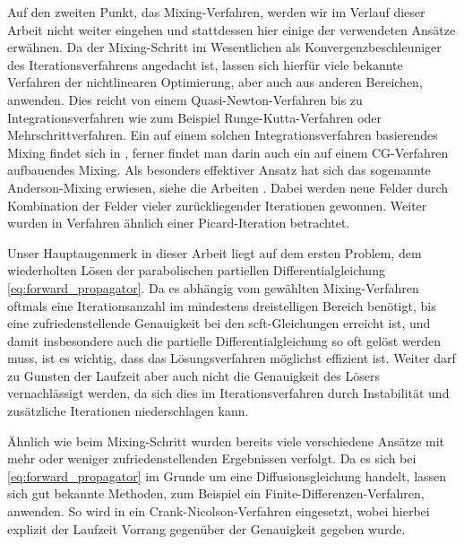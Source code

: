 \documentclass[../main.tex]{subfiles}
\begin{document}
%
Auf den zweiten Punkt, das Mixing-Verfahren, werden wir im Verlauf dieser Arbeit nicht weiter eingehen und stattdessen hier einige der verwendeten Ansätze erwähnen.
Da der Mixing-Schritt im Wesentlichen als Konvergenzbeschleuniger des Iterationsverfahrens angedacht ist, lassen sich hierfür viele bekannte Verfahren der nichtlinearen Optimierung, aber auch aus anderen Bereichen, anwenden.
Dies reicht von einem Quasi-Newton-Verfahren \cite{Matsen:1994bz} bis zu Integrationsverfahren wie zum Beispiel Runge-Kutta-Verfahren oder Mehrschrittverfahren.
Ein auf einem solchen Integrationsverfahren basierendes Mixing findet sich in \cite{Ceniceros:2006is}, ferner findet man darin auch ein auf einem CG-Verfahren aufbauendes Mixing.
Als besonders effektiver Ansatz hat sich das sogenannte Anderson-Mixing erwiesen, siehe die Arbeiten \cite{Thompson:2004um,Stasiak:2011ba}.
Dabei werden neue Felder durch Kombination der Felder vieler zurückliegender Iterationen gewonnen.
Weiter wurden in \cite{Drolet:1999bs} Verfahren ähnlich einer Picard-Iteration betrachtet.

Unser Hauptaugenmerk in dieser Arbeit liegt auf dem ersten Problem, dem wiederholten Lösen der parabolischen partiellen Differentialgleichung \cref{eq:forward_propagator}.
Da es abhängig vom gewählten Mixing-Verfahren oftmals eine Iterationsanzahl im mindestens dreistelligen Bereich benötigt, bis eine zufriedenstellende Genauigkeit bei den \ac{scft}-Gleichungen erreicht ist, und damit insbesondere auch die partielle Differentialgleichung so oft gelöst werden muss, ist es wichtig, dass das Lösungsverfahren möglichst effizient ist.
Weiter darf zu Gunsten der Laufzeit aber auch nicht die Genauigkeit des Lösers vernachlässigt werden, da sich dies im Iterationsverfahren durch Instabilität und zusätzliche Iterationen niederschlagen kann.

Ähnlich wie beim Mixing-Schritt wurden bereits viele verschiedene Ansätze mit mehr oder weniger zufriedenstellenden Ergebnissen verfolgt.
Da es sich bei \cref{eq:forward_propagator} im Grunde um eine Diffusionsgleichung handelt, lassen sich gut bekannte Methoden, zum Beispiel ein Finite-Differenzen-Verfahren, anwenden.
So wird in \cite{Drolet:1999bs} ein Crank-Nicolson-Verfahren eingesetzt, wobei hierbei explizit der Laufzeit Vorrang gegenüber der Genauigkeit gegeben wurde.
\end{document}

